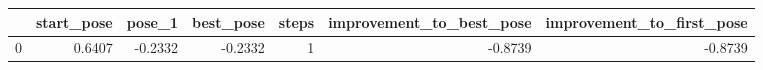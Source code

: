 \begin{tabular}{lrrrrrr}
\toprule
{} &  start\_pose &  pose\_1 &  best\_pose &  steps &  improvement\_to\_best\_pose &  improvement\_to\_first\_pose \\
\midrule
0 &      0.6407 & -0.2332 &    -0.2332 &      1 &                   -0.8739 &                    -0.8739 \\
\bottomrule
\end{tabular}
